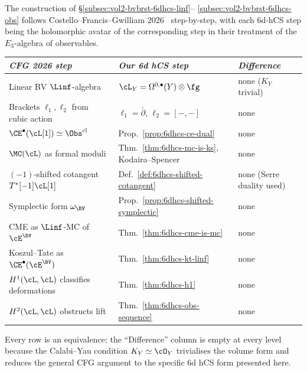 \begin{remark}
\label{rem:6dhcs-cfg-dictionary}
The construction of \S\ref{subsec:vol2-bvbrst-6dhcs-linf}--%
\ref{subsec:vol2-bvbrst-6dhcs-obs} follows Costello--Francis--Gwilliam
2026~\cite{CFG2026} step-by-step, with each 6d-hCS step being the
holomorphic avatar of the corresponding step in their treatment of
the $E_3$-algebra of observables.

{\small
\begin{center}
\begin{tabular}{lll}
\toprule
\emph{CFG 2026 step} & \emph{Our 6d hCS step} & \emph{Difference} \\
\midrule
Linear BV $\Linf$-algebra & $\cL_Y = \Omega^{0,\bullet}(Y)\otimes\fg$
 & none ($K_Y$ trivial) \\
Brackets $\ell_1,\ell_2$ from cubic action
 & $\ell_1 = \bar\partial$, $\ell_2 = [-,-]$ & none \\
$\CE^\bullet(\cL[1]) \simeq \Obs^{\mathrm{cl}}$
 & Prop.~\ref{prop:6dhcs-ce-dual} & none \\
$\MC(\cL)$ as formal moduli
 & Thm.~\ref{thm:6dhcs-mc-is-ks}, Kodaira--Spencer & none \\
$(-1)$-shifted cotangent $T^*[-1]\cL[1]$
 & Def.~\ref{def:6dhcs-shifted-cotangent} & none (Serre duality used) \\
Symplectic form $\omega_{\BV}$ & Prop.~\ref{prop:6dhcs-shifted-symplectic}
 & none \\
CME as $\Linf$-MC of $\cE^{\BV}$
 & Thm.~\ref{thm:6dhcs-cme-is-mc} & none \\
Koszul--Tate as $\CE^\bullet(\cE^{\BV})$
 & Thm.~\ref{thm:6dhcs-kt-linf} & none \\
$H^1(\cL,\cL)$ classifies deformations
 & Thm.~\ref{thm:6dhcs-h1} & none \\
$H^2(\cL,\cL)$ obstructs lift
 & Thm.~\ref{thm:6dhcs-obs-sequence} & none \\
\bottomrule
\end{tabular}
\end{center}
}

Every row is an equivalence; the ``Difference'' column is empty at
every level because the Calabi--Yau condition $K_Y\simeq\cO_Y$
trivialises the volume form and reduces the general CFG argument to
the specific 6d hCS form presented here.
\end{remark}
